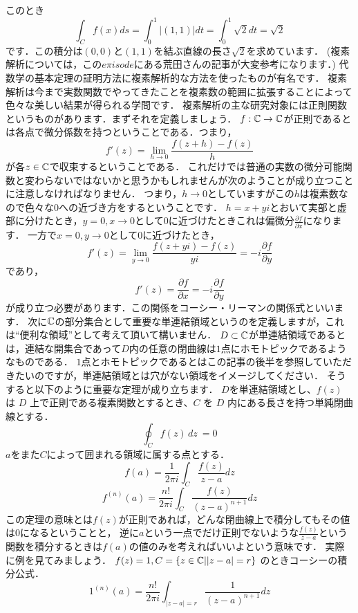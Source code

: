 このとき
\[
\int_C f(x) ds = \int_0^1 |(1,1)| dt = \int_0^1 \sqrt{2}  dt  = \sqrt{2}
\]
です．この積分は$(0,0)$と$(1,1)$を結ぶ直線の長さ$\sqrt{2}$を求めています．
\exx
{}
(複素解析については，この$e\pi isode$にある荒田さんの記事が大変参考になります．)
代数学の基本定理の証明方法に複素解析的な方法を使ったものが有名です．
複素解析は今まで実数関数でやってきたことを複素数の範囲に拡張することによって色々な美しい結果が得られる学問です．
複素解析の主な研究対象には正則関数というものがあります．まずそれを定義しましょう．
$f:\mathbb C \to \mathbb C$が正則であるとは各点で微分係数を持つということである．つまり，
\[
f'(z) = \lim_{h\to 0} \frac{f(z+h) - f(z)}{h}
\]
が各$z\in\mathbb C$で収束するということである．
\rem
これだけでは普通の実数の微分可能関数と変わらないではないかと思うかもしれませんが次のようことが成り立つことに注意しなければなりません．
つまり，$h\to 0$としていますがこの$h$は複素数なので色々な$0$への近づき方をするということです．
$h=x+yi$とおいて実部と虚部に分けたとき，$y=0,x\to 0$として$0$に近づけたときこれは偏微分$\frac{\partial f}{\partial x}$になります．
一方で$x=0,y\to 0$として$0$に近づけたとき，
\[
f'(z) = \lim_{y\to 0} \frac{f(z+yi)-f(z)}{yi} = -i\frac{\partial f}{\partial y}
\]
であり，
\[
f'(z) = \frac{\partial f}{\partial x} = -i\frac{\partial f}{\partial y}
\]
が成り立つ必要があります．この関係をコーシー・リーマンの関係式といいます．
\remx
次に$\mathbb C$の部分集合として重要な単連結領域というのを定義しますが，これは``便利な領域''として考えて頂いて構いません．
$D \subset \mathbb C$が単連結領域であるとは，連結な開集合であって$D$内の任意の閉曲線は$1$点にホモトピックであるようなものである．
$1$点とホモトピックであるとはこの記事の後半を参照していただきたいのですが，単連結領域とは穴がない領域をイメージしてください．
そうすると以下のように重要な定理が成り立ちます．
\thm[コーシーの積分定理と積分公式]
$D$を単連結領域とし、$f(z)$ は $D$ 上で正則である複素関数とするとき、$C$ を $D$ 内にある長さを持つ単純閉曲線とする．
\[
 \oint_C f(z) \, dz\ = 0
\]
$a$をまた$C$によって囲まれる領域に属する点とする．
\[
 f(a) = \frac{1}{2 \pi i}\int_C \frac{f(z)}{z-a}dz
\]
\[
 f^{(n)}(a) = \frac{n!}{2 \pi i}\int_C \frac{f(z)}{(z-a)^{n+1}}dz
\]
\thmx
この定理の意味とは$f(z)$が正則であれば，どんな閉曲線上で積分してもその値は$0$になるということと，
逆に$a$という一点でだけ正則でないような$\frac{f(z)}{z-a}$という関数を積分するときは$f(a)$の値のみを考えればいいよという意味です．
実際に例を見てみましょう．
\ex[コーシーの積分公式の例]
$f(z) = 1 , C = \{z\in\mathbb C | |z-a|=r\} $ のときコーシーの積分公式．\\
\[
1^{(n)}(a) = \frac{n!}{2 \pi i}\int_{|z-a|=r} \frac{1}{(z-a)^{n+1}} dz 
\]
